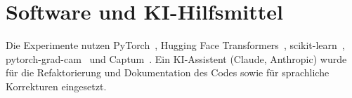 \section{Software und KI-Hilfsmittel}
\label{sec:tools}
Die Experimente nutzen PyTorch~\cite{paszke2019pytorch}, Hugging Face
Transformers~\cite{wolf2020transformers}, scikit-learn~\cite{pedregosa2011sklearn}, pytorch-grad-cam~\cite{gildenblat2021gradcam}
und Captum~\cite{kokhlikyan2020captum}.
Ein KI-Assistent (Claude, Anthropic) wurde für die Refaktorierung und Dokumentation des Codes
sowie für sprachliche Korrekturen eingesetzt.
